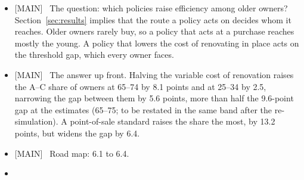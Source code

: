 %
%
\providecommand{\tier}[1]{\textsf{\small [#1]}~}

\iffalse
{}
\begin{itemize}
  \item \tier{MAIN} The question: which policies raise efficiency among older
    owners? Section~\ref{sec:results} implies that the route a policy acts on
    decides whom it reaches. Older owners rarely buy, so a policy that acts
    at a purchase reaches mostly the young. A policy that lowers the cost of
    renovating in place acts on the threshold gap, which every owner faces.
  \item \tier{MAIN} The answer up front. Halving the variable cost of
    renovation raises the A--C share of owners at 65--74 by 8.1 points and at
    25--34 by 2.5, narrowing the gap between them by 5.6 points, more than
    half the 9.6-point gap at the estimates (65--75; to be restated in the
    same band after the re-simulation). A point-of-sale standard
    raises the share the most, by 13.2 points, but widens the gap by 6.4.
  \item \tier{MAIN} Road map: 6.1 to 6.4.
  \item {}
\end{itemize}

